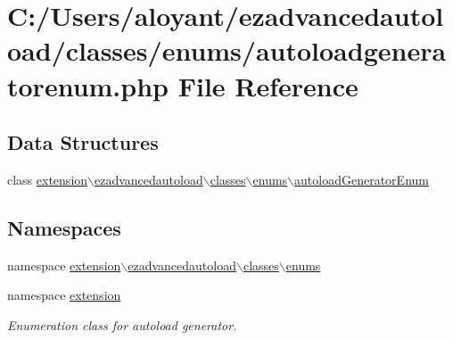 \hypertarget{autoloadgeneratorenum_8php}{\section{C\-:/\-Users/aloyant/ezadvancedautoload/classes/enums/autoloadgeneratorenum.php File Reference}
\label{autoloadgeneratorenum_8php}
}
\subsection*{Data Structures}
\begin{DoxyCompactItemize}
\item 
class \hyperlink{classextension_1_1ezadvancedautoload_1_1classes_1_1enums_1_1autoload_generator_enum}{extension$\backslash$ezadvancedautoload$\backslash$classes$\backslash$enums$\backslash$autoload\-Generator\-Enum}
\end{DoxyCompactItemize}
\subsection*{Namespaces}
\begin{DoxyCompactItemize}
\item 
namespace \hyperlink{namespaceextension_1_1ezadvancedautoload_1_1classes_1_1enums}{extension$\backslash$ezadvancedautoload$\backslash$classes$\backslash$enums}
\item 
namespace \hyperlink{namespaceextension}{extension}
\begin{DoxyCompactList}\small\item\em Enumeration class for autoload generator. \end{DoxyCompactList}\end{DoxyCompactItemize}
